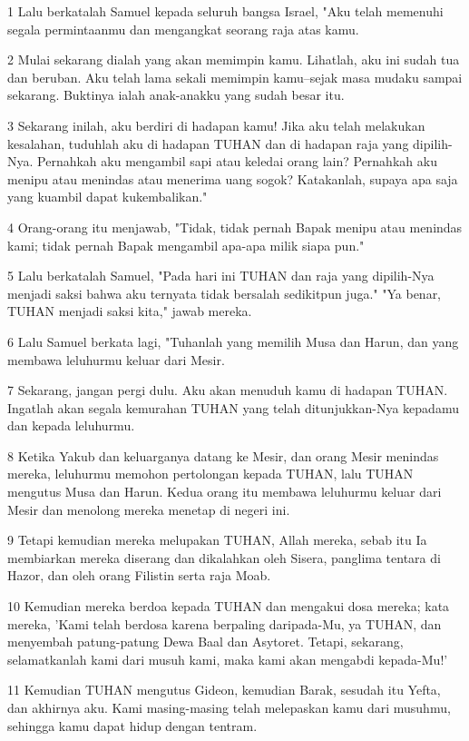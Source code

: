\par 1 Lalu berkatalah Samuel kepada seluruh bangsa Israel, "Aku telah memenuhi segala permintaanmu dan mengangkat seorang raja atas kamu.
\par 2 Mulai sekarang dialah yang akan memimpin kamu. Lihatlah, aku ini sudah tua dan beruban. Aku telah lama sekali memimpin kamu--sejak masa mudaku sampai sekarang. Buktinya ialah anak-anakku yang sudah besar itu.
\par 3 Sekarang inilah, aku berdiri di hadapan kamu! Jika aku telah melakukan kesalahan, tuduhlah aku di hadapan TUHAN dan di hadapan raja yang dipilih-Nya. Pernahkah aku mengambil sapi atau keledai orang lain? Pernahkah aku menipu atau menindas atau menerima uang sogok? Katakanlah, supaya apa saja yang kuambil dapat kukembalikan."
\par 4 Orang-orang itu menjawab, "Tidak, tidak pernah Bapak menipu atau menindas kami; tidak pernah Bapak mengambil apa-apa milik siapa pun."
\par 5 Lalu berkatalah Samuel, "Pada hari ini TUHAN dan raja yang dipilih-Nya menjadi saksi bahwa aku ternyata tidak bersalah sedikitpun juga." "Ya benar, TUHAN menjadi saksi kita," jawab mereka.
\par 6 Lalu Samuel berkata lagi, "Tuhanlah yang memilih Musa dan Harun, dan yang membawa leluhurmu keluar dari Mesir.
\par 7 Sekarang, jangan pergi dulu. Aku akan menuduh kamu di hadapan TUHAN. Ingatlah akan segala kemurahan TUHAN yang telah ditunjukkan-Nya kepadamu dan kepada leluhurmu.
\par 8 Ketika Yakub dan keluarganya datang ke Mesir, dan orang Mesir menindas mereka, leluhurmu memohon pertolongan kepada TUHAN, lalu TUHAN mengutus Musa dan Harun. Kedua orang itu membawa leluhurmu keluar dari Mesir dan menolong mereka menetap di negeri ini.
\par 9 Tetapi kemudian mereka melupakan TUHAN, Allah mereka, sebab itu Ia membiarkan mereka diserang dan dikalahkan oleh Sisera, panglima tentara di Hazor, dan oleh orang Filistin serta raja Moab.
\par 10 Kemudian mereka berdoa kepada TUHAN dan mengakui dosa mereka; kata mereka, 'Kami telah berdosa karena berpaling daripada-Mu, ya TUHAN, dan menyembah patung-patung Dewa Baal dan Asytoret. Tetapi, sekarang, selamatkanlah kami dari musuh kami, maka kami akan mengabdi kepada-Mu!'
\par 11 Kemudian TUHAN mengutus Gideon, kemudian Barak, sesudah itu Yefta, dan akhirnya aku. Kami masing-masing telah melepaskan kamu dari musuhmu, sehingga kamu dapat hidup dengan tentram.

